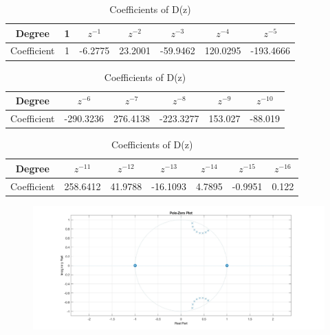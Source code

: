 \documentclass[12pt]{article}
\begin{document}
	\begin{table}[H]
		\begin{center}
			\begin{tabular}{ |c|c|c|c|c|c|c| } 
				\hline
				Degree & 1 & $z^{-1}$ & $z^{-2}$ & $z^{-3}$&$z^{-4}$ & $z^{-5}$\\ 
				\hline
				Coefficient & 1 & -6.2775 & 23.2001 & -59.9462 & 120.0295 & -193.4666 \\
				\hline
			\end{tabular}
		\end{center}
		\begin{center}
			\begin{tabular}{ |c|c|c|c|c|c| } 
				\hline
				Degree & $z^{-6}$ & $z^{-7}$ & $z^{-8}$ & $z^{-9}$ & $z^{-10}$\\ 
				\hline
				Coefficient  & -290.3236 & 276.4138 & -223.3277 & 153.027 & -88.019\\
				\hline
			\end{tabular}
		\end{center}
		\begin{center}
			\begin{tabular}{|c|c|c|c|c|c|c|} 
				\hline
				Degree & $z^{-11}$ & $z^{-12}$ & $z^{-13}$ & $z^{-14}$& $z^{-15}$&$z^{-16}$\\ 
				\hline
				Coefficient & 258.6412 & 41.9788 & -16.1093 & 4.7895 & -0.9951 & 0.122\\
				\hline
			\end{tabular}
		\end{center}
		\caption{Coefficients of D(z)}
		\label{Table 3: }	
		
	\end{table}
	\begin{figure}[H]
		\centering
		\includegraphics[width = 16cm]{Filter1PZ.jpg}
	\end{figure}
\end{document}

